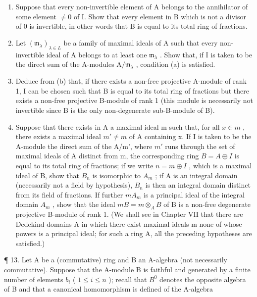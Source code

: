 \begin{enumerate}
\def\labelenumi{(\alph{enumi})}
\item
  Suppose that every non-invertible element of A belongs to the annihilator of some element \(\neq0\) of I. Show that every element in B which is not a divisor of 0 is invertible, in other words that B is equal to its total ring of fractions.
\item
  Let \((\mathfrak{m}_{\lambda})_{\lambda \in L}\) be a family of maximal ideals of A such that every non-invertible ideal of A belongs to at least one \(\mathfrak{m}_{\lambda}\) . Show that, if I is taken to be the direct sum of the A-modules \(\mathrm{A} / \mathfrak{m}_{\lambda}\) , condition (a) is satisfied.
\item
  Deduce from (b) that, if there exists a non-free projective A-module of rank 1, I can be chosen such that B is equal to its total ring of fractions but there exists a non-free projective B-module of rank 1 (this module is necessarily not invertible since B is the only non-degenerate sub-B-module of B).
\item
  Suppose that there exists in A a maximal ideal m such that, for all \(x \in m\) , there exists a maximal ideal \(m' \neq m\) of A containing x. If I is taken to be the A-module the direct sum of the A/m', where \(m'\) runs through the set of maximal ideals of A distinct from m, the corresponding ring \(B = A \oplus I\) is equal to its total ring of fractions; if we write \(n = m \oplus I\) , which is a maximal ideal of B, show that \(B_n\) is isomorphic to \(A_m\) ; if A is an integral domain (necessarily not a field by hypothesis), \(B_n\) is then an integral domain distinct from its field of fractions. If further \(mA_m\) is a principal ideal of the integral domain \(A_m\) , show that the ideal \(mB = m \otimes_A B\) of B is a non-free degenerate projective B-module of rank 1. (We shall see in Chapter VII that there are Dedekind domains A in which there exist maximal ideals m none of whose powers is a principal ideal; for such a ring A, all the preceding hypotheses are satisfied.)
\end{enumerate}

¶ 13. Let A be a (commutative) ring and B an A-algebra (not necessarily commutative). Suppose that the A-module B is faithful and generated by a finite number of elements \(b_i\) ( \(1 \leqslant i \leqslant n\) ); recall that \(B^0\) denotes the opposite algebra of B and that a canonical homomorphism is defined of the A-algebra

